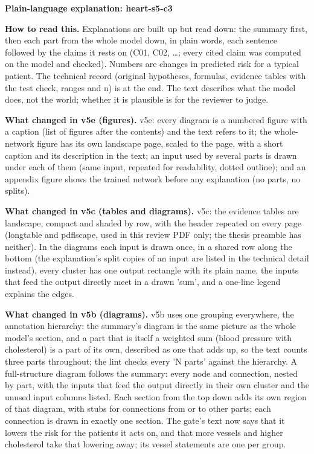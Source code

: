 \documentclass[a4paper,10pt]{article}
\begin{document}
\begin{center}{\Large\bfseries Plain-language explanation: heart-s5-c3\par}\vspace{2mm}{\small AI-assisted drafts for review. Nothing here has been verified by a person.\par}\end{center}
\noindent\textbf{How to read this.} Explanations are built up but read down: the summary first, then each part from the whole model down, in plain words, each sentence followed by the claims it rests on (C01, C02, \ldots; every cited claim was computed on the model and checked). Numbers are changes in predicted risk for a typical patient. The technical record (original hypotheses, formulas, evidence tables with the test check, ranges and n) is at the end. The text describes what the model does, not the world; whether it is plausible is for the reviewer to judge.
\par\medskip\noindent\textbf{What changed in v5e (figures).} v5e: every diagram is a numbered figure with a caption (list of figures after the contents) and the text refers to it; the whole-network figure has its own landscape page, scaled to the page, with a short caption and its description in the text; an input used by several parts is drawn under each of them (same input, repeated for readability, dotted outline); and an appendix figure shows the trained network before any explanation (no parts, no splits).
\par\medskip\noindent\textbf{What changed in v5c (tables and diagrams).} v5c: the evidence tables are landscape, compact and shaded by row, with the header repeated on every page (longtable and pdflscape, used in this review PDF only; the thesis preamble has neither). In the diagrams each input is drawn once, in a shared row along the bottom (the explanation's split copies of an input are listed in the technical detail instead), every cluster has one output rectangle with its plain name, the inputs that feed the output directly meet in a drawn 'sum', and a one-line legend explains the edges.
\par\medskip\noindent\textbf{What changed in v5b (diagrams).} v5b uses one grouping everywhere, the annotation hierarchy: the summary's diagram is the same picture as the whole model's section, and a part that is itself a weighted sum (blood pressure with cholesterol) is a part of its own, described as one that adds up, so the text counts three parts throughout; the lint checks every 'N parts' against the hierarchy. A full-structure diagram follows the summary: every node and connection, nested by part, with the inputs that feed the output directly in their own cluster and the unused input columns listed. Each section from the top down adds its own region of that diagram, with stubs for connections from or to other parts; each connection is drawn in exactly one section. The gate's text now says that it lowers the risk for the patients it acts on, and that more vessels and higher cholesterol take that lowering away; its vessel statements are one per group.
\end{document}

